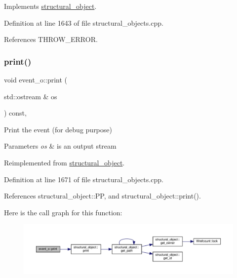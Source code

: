 Implements \hyperlink{classstructural__object_a3a8b2d38c2b5666700053a72868bb6b2}{structural\+\_\+object}.



Definition at line 1643 of file structural\+\_\+objects.\+cpp.



References T\+H\+R\+O\+W\+\_\+\+E\+R\+R\+OR.

\mbox{\label{classevent__o_a013667eb14fd646a89ea8c5ce1c5cd13}} 
\subsubsection{\texorpdfstring{print()}{print()}}
{\footnotesize\ttfamily void event\+\_\+o\+::print (\begin{DoxyParamCaption}\item[{std\+::ostream \&}]{os }\end{DoxyParamCaption}) const\hspace{0.3cm}{\ttfamily [override]}, {\ttfamily [virtual]}}



Print the event (for debug purpose) 


\begin{DoxyParams}{Parameters}
{\em os} & is an output stream \\
\hline
\end{DoxyParams}


Reimplemented from \hyperlink{classstructural__object_a6770e169cf00f814a35b2939ec8f92eb}{structural\+\_\+object}.



Definition at line 1671 of file structural\+\_\+objects.\+cpp.



References structural\+\_\+object\+::\+PP, and structural\+\_\+object\+::print().

Here is the call graph for this function\+:
\nopagebreak
\begin{figure}[H]
\begin{center}
\leavevmode
\includegraphics[width=350pt]{d9/db0/classevent__o_a013667eb14fd646a89ea8c5ce1c5cd13_cgraph}
\end{center}
\end{figure}
\mbox{\label{classevent__o_a933783be16a9351aae3ca84867f950b5}} 
